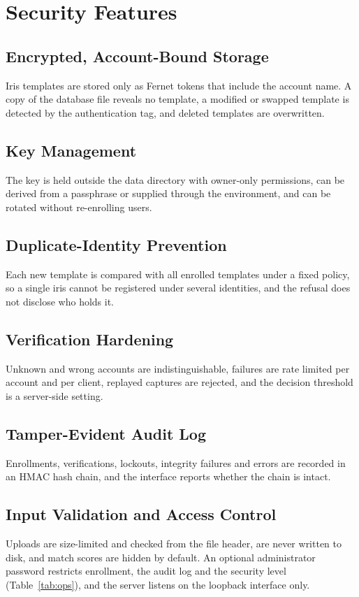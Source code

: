 \documentclass[conference]{IEEEtran}
\begin{document}
\section{Security Features}
\subsection{Encrypted, Account-Bound Storage}
Iris templates are stored only as Fernet tokens that include the account name. A copy of the database file reveals no template, a modified or swapped template is detected by the authentication tag, and deleted templates are overwritten.

\subsection{Key Management}
The key is held outside the data directory with owner-only permissions, can be derived from a passphrase or supplied through the environment, and can be rotated without re-enrolling users.

\subsection{Duplicate-Identity Prevention}
Each new template is compared with all enrolled templates under a fixed policy, so a single iris cannot be registered under several identities, and the refusal does not disclose who holds it.

\subsection{Verification Hardening}
Unknown and wrong accounts are indistinguishable, failures are rate limited per account and per client, replayed captures are rejected, and the decision threshold is a server-side setting.

\subsection{Tamper-Evident Audit Log}
Enrollments, verifications, lockouts, integrity failures and errors are recorded in an HMAC hash chain, and the interface reports whether the chain is intact.

\subsection{Input Validation and Access Control}
Uploads are size-limited and checked from the file header, are never written to disk, and match scores are hidden by default. An optional administrator password restricts enrollment, the audit log and the security level (Table~\ref{tab:ops}), and the server listens on the loopback interface only.
\end{document}
